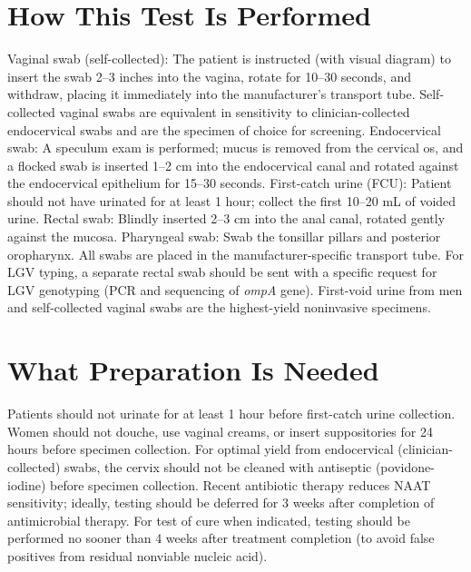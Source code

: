 \section*{How This Test Is Performed}
Vaginal swab (self-collected): The patient is instructed (with visual diagram) to insert the swab 2--3 inches into the vagina, rotate for 10--30 seconds, and withdraw, placing it immediately into the manufacturer's transport tube. Self-collected vaginal swabs are equivalent in sensitivity to clinician-collected endocervical swabs and are the specimen of choice for screening. Endocervical swab: A speculum exam is performed; mucus is removed from the cervical os, and a flocked swab is inserted 1--2 cm into the endocervical canal and rotated against the endocervical epithelium for 15--30 seconds. First-catch urine (FCU): Patient should not have urinated for at least 1 hour; collect the first 10--20 mL of voided urine. Rectal swab: Blindly inserted 2--3 cm into the anal canal, rotated gently against the mucosa. Pharyngeal swab: Swab the tonsillar pillars and posterior oropharynx. All swabs are placed in the manufacturer-specific transport tube. For LGV typing, a separate rectal swab should be sent with a specific request for LGV genotyping (PCR and sequencing of \textit{ompA} gene). First-void urine from men and self-collected vaginal swabs are the highest-yield noninvasive specimens.

\section*{What Preparation Is Needed}
Patients should not urinate for at least 1 hour before first-catch urine collection. Women should not douche, use vaginal creams, or insert suppositories for 24 hours before specimen collection. For optimal yield from endocervical (clinician-collected) swabs, the cervix should not be cleaned with antiseptic (povidone-iodine) before specimen collection. Recent antibiotic therapy reduces NAAT sensitivity; ideally, testing should be deferred for 3 weeks after completion of antimicrobial therapy. For test of cure when indicated, testing should be performed no sooner than 4 weeks after treatment completion (to avoid false positives from residual nonviable nucleic acid).

